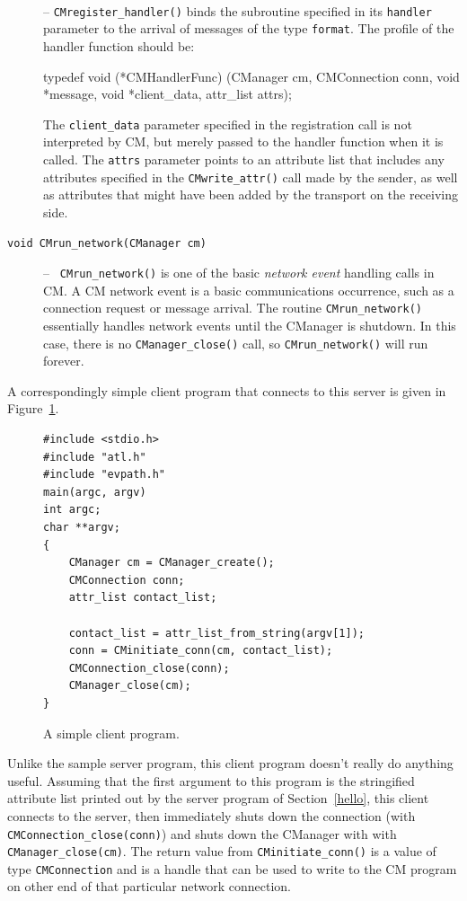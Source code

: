 \documentclass[11pt]{article}
\begin{document}
\begin{description}
\item[\parbox{6.4in}{\tt void CMregister\_handler(CMFormat format, CMHandlerFunc handler,\\
\hspace*{1.9in}void *client\_data)}] \ \\
-- {\tt CMregister\_handler()} binds the
subroutine specified in its {\tt handler} parameter to the arrival of
messages of the type {\tt format}.  The profile of the handler function
should be:
\begin{verbatimtab}
typedef void (*CMHandlerFunc) (CManager cm, CMConnection conn,
                               void *message, void *client_data, attr_list attrs);
\end{verbatimtab}
The {\tt client\_data} parameter specified in the registration call is not
interpreted by CM, but merely passed to the handler function when it is
called.   
The {\tt attrs} parameter points to an attribute list that includes any
attributes specified in the {\tt CMwrite\_attr()} call made by the sender, as
well as attributes that might have been added by the transport on the
receiving side.

\item[{\tt void CMrun\_network(CManager cm)}] -- {\tt
CMrun\_network()} is one of the basic {\it network event} handling calls in
CM.  A CM network event is a basic communications occurrence, such as a
connection request or message arrival. The routine {\tt CMrun\_network()}
essentially handles network events until the CManager is shutdown.  In this
case, there is no {\tt CManager\_close()} call, so {\tt CMrun\_network()}
will run forever. 
\end{description}

A correspondingly simple client program that connects to this server is given
in Figure~\ref{simple_client}.
\begin{figure}
\begin{center}
\begin{BVerbatim}
#include <stdio.h>
#include "atl.h"
#include "evpath.h"
main(argc, argv)
int argc;
char **argv;
{
    CManager cm = CManager_create();
    CMConnection conn;
    attr_list contact_list;

    contact_list = attr_list_from_string(argv[1]);
    conn = CMinitiate_conn(cm, contact_list);
    CMConnection_close(conn);
    CManager_close(cm);
}
\end{BVerbatim}
\end{center}
\caption{A simple client program.\label{simple_client}}
\end{figure}
Unlike the sample server program, this client program doesn't really do
anything useful.  Assuming that the first argument to this program is the
stringified attribute list printed out by the server program of
Section~\ref{hello}, this client connects to the server, then
immediately shuts down the connection (with {\tt CMConnection\_close(conn)})
and shuts down the CManager with with {\tt CManager\_close(cm)}.  The return
value from {\tt CMinitiate\_conn()} is a value of type {\tt CMConnection}
and is a handle that can be used to write to the CM program on other end of
that particular network connection.   
\end{document}

